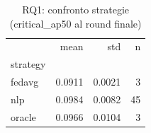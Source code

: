 \begin{table}[h]
\centering
\begin{tabular}{lrrr}
\toprule
 & mean & std & n \\
strategy &  &  &  \\
\midrule
fedavg & 0.0911 & 0.0021 & 3 \\
nlp & 0.0984 & 0.0082 & 45 \\
oracle & 0.0966 & 0.0104 & 3 \\
\bottomrule
\end{tabular}
\caption{RQ1: confronto strategie (critical_ap50 al round finale)}
\label{tab:rq1_summary}
\end{table}
